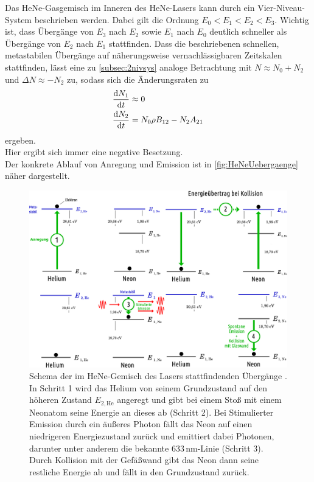 Das HeNe-Gasgemisch im Inneren des HeNe-Lasers kann durch ein Vier-Niveau-System beschrieben werden.
Dabei gilt die Ordnung $E_0 < E_1 < E_2 < E_3$. Wichtig ist, dass Übergänge von $E_3$ nach $E_2$ sowie $E_1$ nach $E_0$ deutlich schneller als Übergänge von $E_2$ nach $E_1$ stattfinden.
Dass die beschriebenen schnellen, metastabilen Übergänge auf näherungsweise vernachlässigbaren Zeitskalen stattfinden, lässt eine zu \autoref{subsec:2nivsys} analoge Betrachtung mit
$N \approx N_0 + N_2$ und $\Delta N \approx - N_2$ zu, sodass sich die Änderungsraten zu
\begin{align*}
    \frac{\mathrm{d} N_1}{\mathrm{d} t} &\approx 0 \\
    \frac{\mathrm{d} N_2}{\mathrm{d} t} &= N_0 \rho B_{12} - N_2 A_{21}
\end{align*}
ergeben. \\
Hier ergibt sich immer eine negative Besetzung. \\

Der konkrete Ablauf von Anregung und Emission ist in \autoref{fig:HeNeUebergaenge} näher dargestellt.

\begin{figure}[H]
    \centering
    \includegraphics[width=\textwidth]{figures/HeNe-LaserÜbergänge.pdf}
    \caption{Schema der im HeNe-Gemisch des Lasers stattfindenden Übergänge \cite{leifi}. In Schritt 1 wird das Helium von seinem Grundzustand auf den höheren Zustand $E_{2,\text{He}}$ angeregt und gibt bei einem Stoß
    mit einem Neonatom seine Energie an dieses ab (Schritt 2). Bei Stimulierter Emission durch ein äußeres Photon fällt das Neon auf einen niedrigeren Energiezustand zurück und emittiert dabei Photonen, darunter unter
    anderem die bekannte $633 \,\unit{\nano\meter}$-Linie (Schritt 3). Durch Kollision mit der Gefäßwand gibt das Neon dann seine restliche Energie ab und fällt in den Grundzustand zurück.}
    \label{fig:HeNeUebergaenge}
\end{figure}

